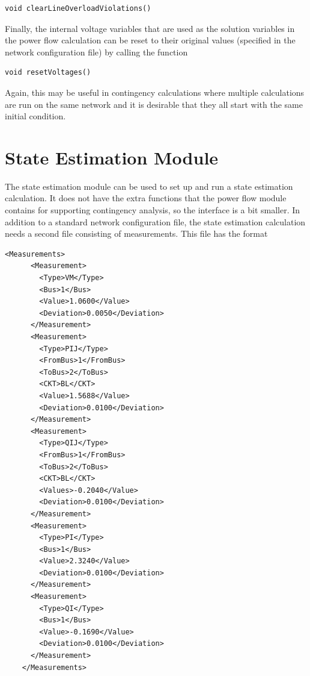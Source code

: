 \documentclass[12pt]{report} %
\begin{document}
{
\color{red}
\begin{Verbatim}[fontseries=b]
void clearLineOverloadViolations()
\end{Verbatim}
}

Finally, the internal voltage variables that are used as the solution variables in the power flow calculation can be reset to their original values (specified in the network configuration file) by calling the function

{
\color{red}
\begin{Verbatim}[fontseries=b]
void resetVoltages()
\end{Verbatim}
}

Again, this may be useful in contingency calculations where multiple calculations are run on the same network and it is desirable that they all start with the same initial condition.

\section{State Estimation Module}

The state estimation module can be used to set up and run a state estimation calculation. It does not have the extra functions that the power flow module contains for supporting contingency analysis, so the interface is a bit smaller. In addition to a standard network configuration file, the state estimation calculation needs a second file consisting of measurements. This file has the format

{
\color{blue}
\begin{Verbatim}[fontseries=b]
    <Measurements>
      <Measurement>
        <Type>VM</Type>
        <Bus>1</Bus>
        <Value>1.0600</Value>
        <Deviation>0.0050</Deviation>
      </Measurement>
      <Measurement>
        <Type>PIJ</Type>
        <FromBus>1</FromBus>
        <ToBus>2</ToBus>
        <CKT>BL</CKT>
        <Value>1.5688</Value>
        <Deviation>0.0100</Deviation>
      </Measurement>
      <Measurement>
        <Type>QIJ</Type>
        <FromBus>1</FromBus>
        <ToBus>2</ToBus>
        <CKT>BL</CKT>
        <Values>-0.2040</Value>
        <Deviation>0.0100</Deviation>
      </Measurement>
      <Measurement>
        <Type>PI</Type>
        <Bus>1</Bus>
        <Value>2.3240</Value>
        <Deviation>0.0100</Deviation>
      </Measurement>
      <Measurement>
        <Type>QI</Type>
        <Bus>1</Bus>
        <Value>-0.1690</Value>
        <Deviation>0.0100</Deviation>
      </Measurement>
    </Measurements>
\end{Verbatim}
}
\end{document}
